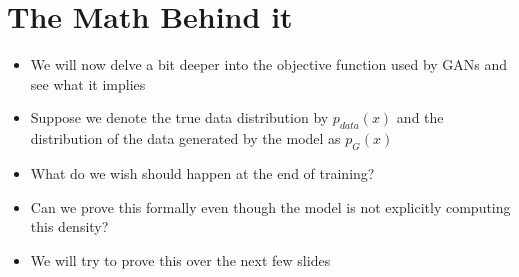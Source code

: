\section{The Math Behind it}
\begin{frame}
\end{frame}

\begin{frame}
	\begin{itemize}
		\item<1-> We will now delve a bit deeper into the objective function used by GANs and see what it implies
		\item<2-> Suppose we denote the true data distribution by $p_{data}(x)$ and the distribution of the data generated by the model as $p_G(x)$
		\item<3-> What do we wish should happen at the end of training? 
					\visible<4->{ $$p_G(x) = p_{data}(x)$$ }
		\item<5-> Can we prove this formally even though the model is not explicitly computing this density?
		\item<6-> We will try to prove this over the next few slides
	\end{itemize}
\end{frame}

